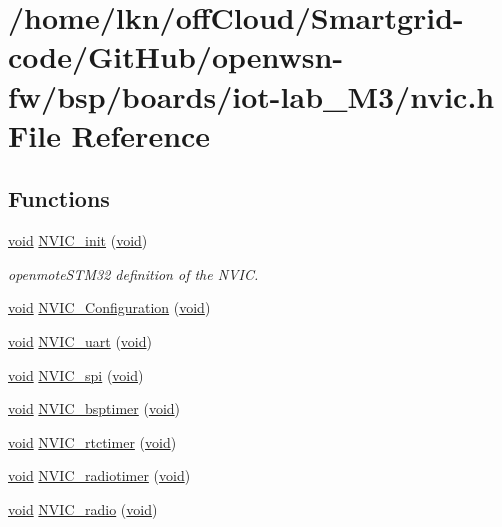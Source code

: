 \hypertarget{iot-lab___m3_2nvic_8h}{}\section{/home/lkn/off\+Cloud/\+Smartgrid-\/code/\+Git\+Hub/openwsn-\/fw/bsp/boards/iot-\/lab\+\_\+\+M3/nvic.h File Reference}
\label{iot-lab___m3_2nvic_8h}
\subsection*{Functions}
\begin{DoxyCompactItemize}
\item 
\hyperlink{usb__devapi_8h_afabf60e7f57651d6d595a02c75f07cd0}{void} \hyperlink{iot-lab___m3_2nvic_8h_a1981672e898044e1f11c22e019e25823}{N\+V\+I\+C\+\_\+init} (\hyperlink{usb__devapi_8h_afabf60e7f57651d6d595a02c75f07cd0}{void})
\begin{DoxyCompactList}\small\item\em openmote\+S\+T\+M32 definition of the N\+V\+IC. \end{DoxyCompactList}\item 
\hyperlink{usb__devapi_8h_afabf60e7f57651d6d595a02c75f07cd0}{void} \hyperlink{iot-lab___m3_2nvic_8h_a5c12343e267ace8587309499bea6babe}{N\+V\+I\+C\+\_\+\+Configuration} (\hyperlink{usb__devapi_8h_afabf60e7f57651d6d595a02c75f07cd0}{void})
\item 
\hyperlink{usb__devapi_8h_afabf60e7f57651d6d595a02c75f07cd0}{void} \hyperlink{iot-lab___m3_2nvic_8h_a36190a9217bee6e01e42721f2d7276d5}{N\+V\+I\+C\+\_\+uart} (\hyperlink{usb__devapi_8h_afabf60e7f57651d6d595a02c75f07cd0}{void})
\item 
\hyperlink{usb__devapi_8h_afabf60e7f57651d6d595a02c75f07cd0}{void} \hyperlink{iot-lab___m3_2nvic_8h_a7681089016909b7696547e1533d5d298}{N\+V\+I\+C\+\_\+spi} (\hyperlink{usb__devapi_8h_afabf60e7f57651d6d595a02c75f07cd0}{void})
\item 
\hyperlink{usb__devapi_8h_afabf60e7f57651d6d595a02c75f07cd0}{void} \hyperlink{iot-lab___m3_2nvic_8h_a536b37a571b01eaef542b4cb9da4e14c}{N\+V\+I\+C\+\_\+bsptimer} (\hyperlink{usb__devapi_8h_afabf60e7f57651d6d595a02c75f07cd0}{void})
\item 
\hyperlink{usb__devapi_8h_afabf60e7f57651d6d595a02c75f07cd0}{void} \hyperlink{iot-lab___m3_2nvic_8h_aff46ffbf74b7562de23473f7429cc6c0}{N\+V\+I\+C\+\_\+rtctimer} (\hyperlink{usb__devapi_8h_afabf60e7f57651d6d595a02c75f07cd0}{void})
\item 
\hyperlink{usb__devapi_8h_afabf60e7f57651d6d595a02c75f07cd0}{void} \hyperlink{iot-lab___m3_2nvic_8h_a1342517ba36f7fedc50927b8b4f5d22b}{N\+V\+I\+C\+\_\+radiotimer} (\hyperlink{usb__devapi_8h_afabf60e7f57651d6d595a02c75f07cd0}{void})
\item 
\hyperlink{usb__devapi_8h_afabf60e7f57651d6d595a02c75f07cd0}{void} \hyperlink{iot-lab___m3_2nvic_8h_a8e4bc4d65467be6631cbb163ff875f66}{N\+V\+I\+C\+\_\+radio} (\hyperlink{usb__devapi_8h_afabf60e7f57651d6d595a02c75f07cd0}{void})
\end{DoxyCompactItemize}



